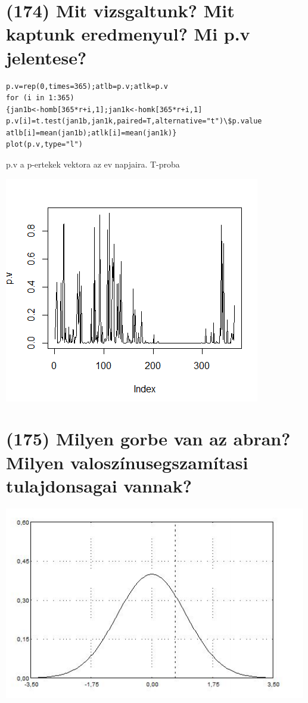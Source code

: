 \documentclass[12p]{article}
\begin{document}
\section{(174)  Mit vizsgaltunk? Mit kaptunk eredmenyul? Mi p.v jelentese?}

\begin{verbatim}
p.v=rep(0,times=365);atlb=p.v;atlk=p.v
for (i in 1:365)
{jan1b<-homb[365*r+i,1];jan1k<-homk[365*r+i,1]
p.v[i]=t.test(jan1b,jan1k,paired=T,alternative="t")\$p.value
atlb[i]=mean(jan1b);atlk[i]=mean(jan1k)}
plot(p.v,type="l")
\end{verbatim}

p.v a p-ertekek vektora az ev napjaira. T-proba

\includegraphics{pv}

\section{(175) Milyen gorbe van az abran? Milyen valoszínusegszamítasi tulajdonsagai vannak?}

\includegraphics{gorbe}
\end{document}
